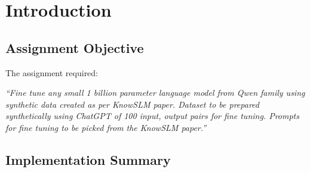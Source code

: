 \documentclass[12pt,a4paper]{article}
\begin{document}
\begin{abstract}
This report documents the fine-tuning of the \textbf{Qwen 2.5 1.5B-Instruct} language model using \textbf{Low-Rank Adaptation (LoRA)} on a synthetically generated emotional conversation dataset. Following the methodology outlined in the \textbf{KnowSLM paper} (arXiv:2504.04569), we created 100 input-output pairs using ChatGPT, formatted them according to the paper's guidelines for humanized conversations, and trained LoRA adapters targeting attention projection layers. The training was conducted on Apple Silicon (MPS device) without quantization. Results show successful style adaptation from generic responses to empathetic, conversational outputs with follow-up questions, achieving a final loss of 0.96 and token accuracy of 78.6\%.
\end{abstract}

\tableofcontents
\newpage

\section{Introduction}

\subsection{Assignment Objective}

The assignment required:

\begin{tcolorbox}[colback=blue!5!white,colframe=blue!75!black,title=Assignment Requirements]
\textit{``Fine tune any small 1 billion parameter language model from Qwen family using synthetic data created as per KnowSLM paper. Dataset to be prepared synthetically using ChatGPT of 100 input, output pairs for fine tuning. Prompts for fine tuning to be picked from the KnowSLM paper.''}
\end{tcolorbox}

\subsection{Implementation Summary}
\end{document}
